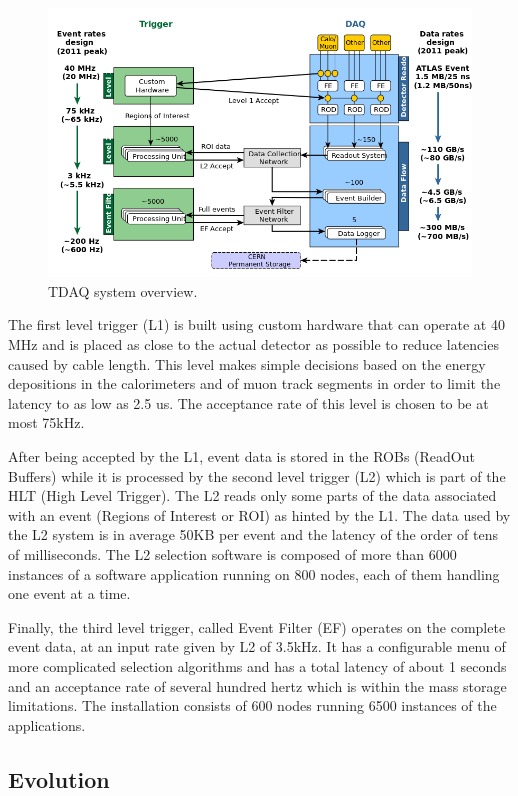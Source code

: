 \begin{figure}[ht!]
\centering
\includegraphics[scale=0.5]{Images/Trigger.png}
\caption{TDAQ system overview.}
\end{figure}

The first level trigger (L1) is built using custom hardware that can operate at 40 MHz and is placed as close to the actual detector as possible to reduce latencies caused by cable length. This level makes simple decisions based on the energy depositions in the calorimeters and of muon track segments in order to limit the latency to as low as 2.5 us. The acceptance rate of this level is chosen to be at most 75kHz. 

After being accepted by the L1, event data is stored in the ROBs (ReadOut Buffers) while it is processed by the second level trigger (L2) which is part of the HLT (High Level Trigger). The L2 reads only some parts of the data associated with an event (Regions of Interest or ROI) as hinted by the L1. The data used by the L2 system is in average 50KB per event and the latency of the order of tens of milliseconds. The L2 selection software is composed of more than 6000 instances of a software application running on 800 nodes, each of them handling one event at a time. 

Finally, the third level trigger, called Event Filter (EF) operates on the complete event data, at an input rate given by L2 of 3.5kHz. It has a configurable menu of more complicated selection algorithms and has a total latency of about 1 seconds and an acceptance rate of several hundred hertz which is within the mass storage limitations. The installation consists of 600 nodes running 6500 instances of the applications.

\subsection*{Evolution}

